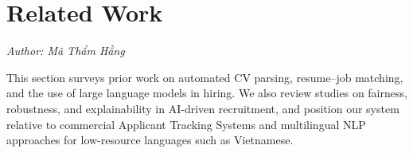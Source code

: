 \section{Related Work}
\noindent\textit{Author: Mã Thẩm Hằng}


This section surveys prior work on automated CV parsing, resume--job matching,
and the use of large language models in hiring. We also review studies on
fairness, robustness, and explainability in AI-driven recruitment, and
position our system relative to commercial Applicant Tracking Systems and
multilingual NLP approaches for low-resource languages such as Vietnamese.
